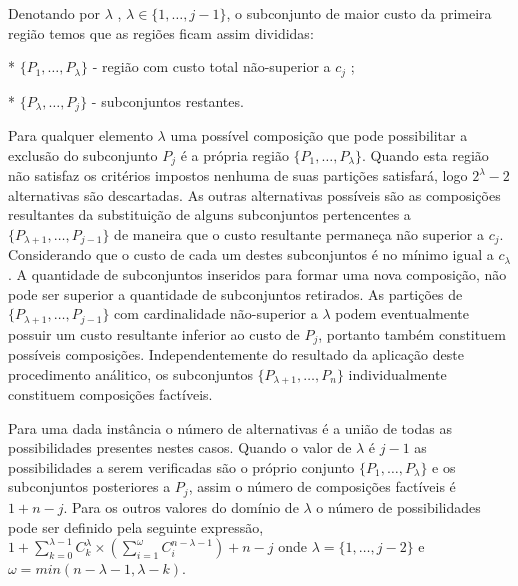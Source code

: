 \documentclass[a4paper,10pt]{article}
\begin{document}
Denotando por $ \lambda $ , $ \lambda \in \{ 1, \dots , j-1 \}$, o subconjunto de maior custo da primeira região temos que as regiões ficam assim divididas:

 * $ \{ P_{1}, \dots , P_{ \lambda } \}$ - região com custo total não-superior a $c_{j}$ ;

 * $ \{ P_{ \lambda } , \dots , P_{j} \}$ - subconjuntos restantes.

Para qualquer elemento $\lambda$ uma possível composição que pode possibilitar a exclusão do subconjunto $P_{j}$ é a própria região $ \{P_{1}, \dots , P_{ \lambda} \}$. Quando esta região não satisfaz os critérios impostos nenhuma de suas partições satisfará, logo $2 ^{ \lambda} -2$ alternativas são descartadas. As outras alternativas possíveis são as composições resultantes da substituição de alguns subconjuntos pertencentes a $ \{ P_{ \lambda +1} , \dots , P_{j-1} \}$ de maneira que o custo resultante permaneça não superior a $c _{j}$. Considerando que o custo de cada um destes subconjuntos é no mínimo igual a $c_{ \lambda }$. A quantidade de subconjuntos inseridos para formar uma nova composição, não pode ser superior a quantidade de subconjuntos retirados. As partições de $ \{ P_{ \lambda +1} , \dots , P_{j-1} \}$ com cardinalidade não-superior a $\lambda$ podem eventualmente possuir um custo resultante inferior ao custo de $P_{j}$, portanto também constituem possíveis composições. Independentemente do resultado da aplicação deste procedimento análitico, os subconjuntos $ \{ P_{ \lambda +1}, \dots , P_{n} \} $ individualmente constituem composições factíveis.

Para uma dada instância o número de alternativas é a união de todas as possibilidades presentes nestes casos. Quando o valor de $ \lambda $ é $j-1$ as possibilidades a serem verificadas são o próprio conjunto $ \{ P_{1}, \dots , P_{ \lambda } \}$ e os subconjuntos posteriores a $P_{j}$, assim o número de composições factíveis é $1+n-j$. Para os outros valores do domínio de $\lambda$ o número de possibilidades pode ser definido pela seguinte expressão, $ 1 + \sum ^{ \lambda -1 } _{k=0} C ^{\lambda} _{k} \times ( \sum ^{\omega} _{i=1} C ^{n- \lambda -1} _{i} ) +n - j$ onde $\lambda =\{1, \dots, j-2 \}$ e $\omega = min(n- \lambda-1, \lambda -k)$.

\paragraph{}
\end{document}
